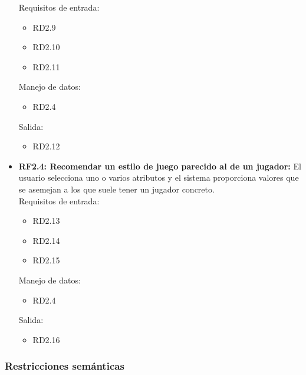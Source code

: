 \begin{itemize}
			Requisitos de entrada:
			\begin{itemize}
				\item RD2.9 %
				\item RD2.10 %
				\item RD2.11 %
			\end{itemize}
			Manejo de datos:
			\begin{itemize}
				\item RD2.4 %
			\end{itemize}
			Salida:
			\begin{itemize}
				\item RD2.12 %
			\end{itemize}

	\item \textbf{RF2.4: Recomendar un estilo de juego parecido al
		de un jugador:}
		El usuario selecciona uno o varios atributos y el sistema
		proporciona valores que se asemejan a los que suele tener
		un jugador concreto.\\

		Requisitos de entrada:
		\begin{itemize}
			\item RD2.13 %
			\item RD2.14 %
			\item RD2.15 %
		\end{itemize}
		Manejo de datos:
		\begin{itemize}
			\item RD2.4
		\end{itemize}
		Salida:
		\begin{itemize}
			\item RD2.16 %
		\end{itemize}

	\end{itemize}


\subsubsection{Restricciones semánticas}
